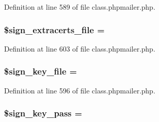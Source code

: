 Definition at line 589 of file class.\+phpmailer.\+php.

\subsubsection[{\texorpdfstring{\$sign\+\_\+extracerts\+\_\+file}{$sign_extracerts_file}}]{\setlength{\rightskip}{0pt plus 5cm}\$sign\+\_\+extracerts\+\_\+file = \textquotesingle{}\textquotesingle{}\hspace{0.3cm}{\ttfamily [protected]}}\hypertarget{class_p_h_p_mailer_ae510d44770a6bd6f11170a5d88c0d6fc}{}\label{class_p_h_p_mailer_ae510d44770a6bd6f11170a5d88c0d6fc}


Definition at line 603 of file class.\+phpmailer.\+php.

\subsubsection[{\texorpdfstring{\$sign\+\_\+key\+\_\+file}{$sign_key_file}}]{\setlength{\rightskip}{0pt plus 5cm}\$sign\+\_\+key\+\_\+file = \textquotesingle{}\textquotesingle{}\hspace{0.3cm}{\ttfamily [protected]}}\hypertarget{class_p_h_p_mailer_a984a5cd10ea13b5c25b9088004469712}{}\label{class_p_h_p_mailer_a984a5cd10ea13b5c25b9088004469712}


Definition at line 596 of file class.\+phpmailer.\+php.

\subsubsection[{\texorpdfstring{\$sign\+\_\+key\+\_\+pass}{$sign_key_pass}}]{\setlength{\rightskip}{0pt plus 5cm}\$sign\+\_\+key\+\_\+pass = \textquotesingle{}\textquotesingle{}\hspace{0.3cm}{\ttfamily [protected]}}\hypertarget{class_p_h_p_mailer_ad6ab22b5338f0053e25887fde1f7fd47}{}\label{class_p_h_p_mailer_ad6ab22b5338f0053e25887fde1f7fd47}


